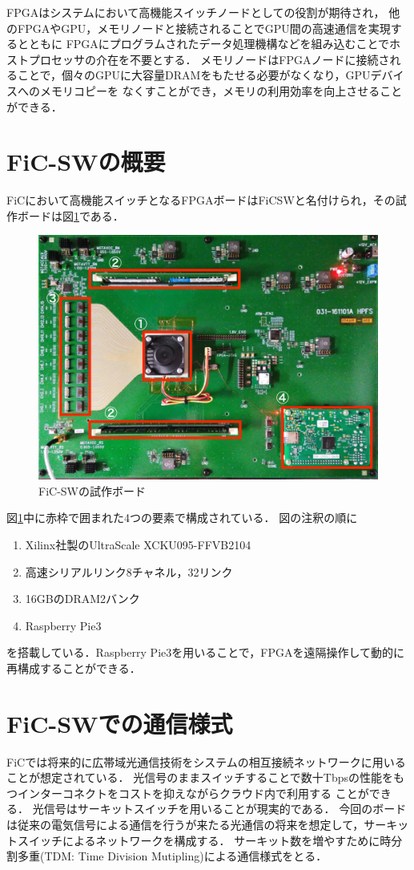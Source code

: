 {  FPGAはシステムにおいて高機能スイッチノードとしての役割が期待され，
  他のFPGAやGPU，メモリノードと接続されることでGPU間の高速通信を実現するとともに
  FPGAにプログラムされたデータ処理機構などを組み込むことでホストプロセッサの介在を不要とする．
  メモリノードはFPGAノードに接続されることで，個々のGPUに大容量DRAMをもたせる必要がなくなり，GPUデバイスへのメモリコピーを
  なくすことができ，メモリの利用効率を向上させることができる．
  
  \section{FiC-SWの概要}
  \label{sec:about_ficsw}
  FiCにおいて高機能スイッチとなるFPGAボードはFiCSWと名付けられ，その試作ボードは図\ref{fig:ficsw}である．
  
  \begin{figure}[h]
    \centering
    \includegraphics[width=12cm]{./chap3/fig/ficsw.png}
    \caption{FiC-SWの試作ボード}
    \label{fig:ficsw}
  \end{figure}
  
  図\ref{fig:ficsw}中に赤枠で囲まれた4つの要素で構成されている．
  図の注釈の順に
  \begin{enumerate}
    \item Xilinx社製のUltraScale XCKU095-FFVB2104
    \item 高速シリアルリンク8チャネル，32リンク
    \item 16GBのDRAM2バンク
    \item Raspberry Pie3
  \end{enumerate}
  を搭載している．Raspberry Pie3を用いることで，FPGAを遠隔操作して動的に再構成することができる．
  
  \section{FiC-SWでの通信様式}
  \label{sec:ficsw_communication}
  FiCでは将来的に広帯域光通信技術をシステムの相互接続ネットワークに用いることが想定されている．
  光信号のままスイッチすることで数十Tbpsの性能をもつインターコネクトをコストを抑えながらクラウド内で利用する
  ことができる．
  光信号はサーキットスイッチを用いることが現実的である．
  今回のボードは従来の電気信号による通信を行うが来たる光通信の将来を想定して，サーキットスイッチによるネットワークを構成する．
  サーキット数を増やすために時分割多重(TDM: Time Division Mutipling)による通信様式をとる．
  
}
